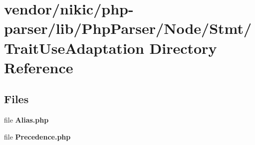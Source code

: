 \section{vendor/nikic/php-\/parser/lib/\+Php\+Parser/\+Node/\+Stmt/\+Trait\+Use\+Adaptation Directory Reference}
\label{dir_1f46208a92a52a35f251e6d57550f28f}
\subsection*{Files}
\begin{DoxyCompactItemize}
\item 
file {\bf Alias.\+php}
\item 
file {\bf Precedence.\+php}
\end{DoxyCompactItemize}
